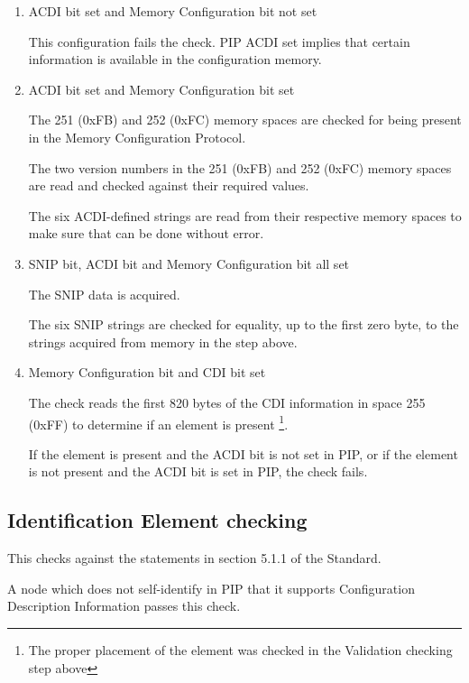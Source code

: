\begin{enumerate}

\item ACDI bit set and Memory Configuration bit not set

This configuration fails the check.  PIP ACDI set implies that certain information 
is available in the configuration memory.

\item ACDI bit set and Memory Configuration bit set

The 251 (0xFB) and 252 (0xFC) memory spaces are checked for
being present in the Memory Configuration Protocol.

The two version numbers in the 251 (0xFB) and 252 (0xFC) memory spaces
are read and checked against their required values.

The six ACDI-defined strings are read from their respective memory spaces
to make sure that can be done without error.

\item SNIP bit, ACDI bit and Memory Configuration bit all set

The SNIP data is acquired.
 
The six SNIP strings are checked for equality, up to the first zero byte, to the
strings acquired from memory in the step above.

\item Memory Configuration bit and CDI bit set

The check reads the first 820 bytes of the CDI information in space 255 (0xFF) to 
determine if an  element is present
\footnote{The proper placement of the  element was checked in the Validation 
checking step above}.  

If the  element is present and the ACDI bit is not set in PIP, or
if the  element is not present and the ACDI bit is set in PIP,
the check fails.

\end{enumerate}

\subsection{Identification Element checking}

This checks against the statements in section 5.1.1 of the Standard.

A node which does not self-identify in PIP that it supports
Configuration Description Information passes this check.
\pipsetFootnote

